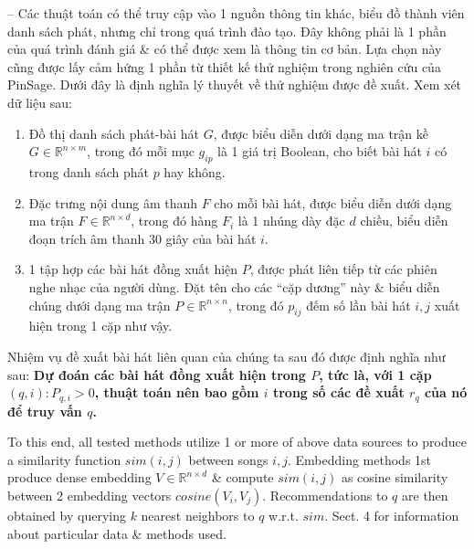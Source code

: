 \documentclass{article}
\begin{document}
\begin{itemize}
\begin{itemize}
        -- Các thuật toán có thể truy cập vào 1 nguồn thông tin khác, biểu đồ thành viên danh sách phát, nhưng chỉ trong quá trình đào tạo. Đây không phải là 1 phần của quá trình đánh giá \& có thể được xem là thông tin cơ bản. Lựa chọn này cũng được lấy cảm hứng 1 phần từ thiết kế thử nghiệm trong nghiên cứu của PinSage. Dưới đây là định nghĩa lý thuyết về thử nghiệm được đề xuất. Xem xét dữ liệu sau:
        \begin{enumerate}
            \item Đồ thị danh sách phát-bài hát $G$, được biểu diễn dưới dạng ma trận kề $G\in\mathbb{R}^{n\times m}$, trong đó mỗi mục $g_{ip}$ là 1 giá trị Boolean, cho biết bài hát $i$ có trong danh sách phát $p$ hay không.
            \item Đặc trưng nội dung âm thanh $F$ cho mỗi bài hát, được biểu diễn dưới dạng ma trận $F\in\mathbb{R}^{n\times d}$, trong đó hàng $F_i$ là 1 nhúng dày đặc $d$ chiều, biểu diễn đoạn trích âm thanh 30 giây của bài hát $i$.
            \item 1 tập hợp các bài hát đồng xuất hiện $P$, được phát liên tiếp từ các phiên nghe nhạc của người dùng. Đặt tên cho các ``cặp dương'' này \& biểu diễn chúng dưới dạng ma trận $P\in\mathbb{R}^{n\times n}$, trong đó $p_{ij}$ đếm số lần bài hát $i,j$ xuất hiện trong 1 cặp như vậy.
        \end{enumerate}
        Nhiệm vụ đề xuất bài hát liên quan của chúng ta sau đó được định nghĩa như sau: {\bf Dự đoán các bài hát đồng xuất hiện trong $P$, tức là, với 1 cặp $(q,i):P_{q,i} > 0$, thuật toán nên bao gồm $i$ trong số các đề xuất $r_q$ của nó để truy vấn $q$.}

        To this end, all tested methods utilize 1 or more of above data sources to produce a similarity function $sim(i,j)$ between songs $i,j$. Embedding methods 1st produce dense embedding $V\in\mathbb{R}^{n\times d}$ \& compute $sim(i,j)$ as cosine similarity between 2 embedding vectors $cosine(V_i,V_j)$. Recommendations to $q$ are then obtained by querying $k$ nearest neighbors to $q$ w.r.t. $sim$. Sect. 4 for information about particular data \& methods used.


\end{itemize}
\end{itemize}
\end{document}

